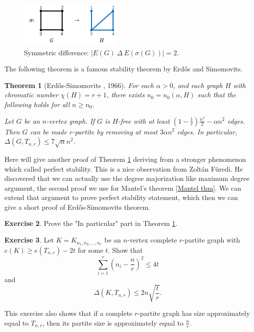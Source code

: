\documentclass{article}
\newtheorem{theorem}{Theorem}[section]
\theoremstyle{definition}
\newtheorem{exercise}[theorem]{Exercise}
\def\Erdos{Erd\H{o}s}
\begin{document}
\begin{figure}[htbp]
        \centering
        \includegraphics[width=5cm]{6-1.png}
        \caption{Symmetric difference: $|E(G)\ \Delta \ E(\sigma(G))| = 2$.}
        \label{fig:6-1}
    \end{figure}
The following theorem is a famous stability theorem by \Erdos{} and Simomovits.
\begin{theorem}[\Erdos{}-Simomovits \cite{Erds1966}, 1966]{}{}\label{ESstability}
    For each $\alpha >0$, and each graph $H$ with chromatic number $\chi(H) = r+1$, there exists $n_0 = n_0(\alpha , H)$ such that the following holds for all $n \geq n_0$.
    
    Let $G$ be an $n$-vertex graph. If $G$ is $H$-free with at least $(1-\frac{1}{r})\frac{n^2}{2}-\alpha n^2$ edges. Then $G$ can be made $r$-partite by removing at most $3\alpha n^2$ edges.
    In particular, $\Delta(G,T_{n,r}) \leq 7\sqrt{\alpha}n^2$.
\end{theorem}

Here will give another proof of Theorem \ref{ESstability} deriving from a stronger phenomenon which called perfect stability. This is a nice observation from Zolt\'an F\"uredi. He discovered that we can actually use the degree  majorization like maximum degree argument, the second proof we use for Mantel's theorem \ref{Mantel thm}. We can extend that argument to prove perfect stability statement, which then we can give a short proof of \Erdos{}-Simomovits theorem.

\begin{exercise}
    Prove the "In particular" part in Theorem \ref{ESstability}.
\end{exercise}

\begin{exercise}
    Let $K=K_{n_1, n_2, \dots, n_r}$ be an $n$-vertex complete $r$-partite graph with $e(K) \geq e(T_{n,r}) -2t$ for some $t$. Show that $$\sum\limits_{i=1}^{r} (n_i - \frac{n}{r})^2 \leq 4t$$ and $$\Delta(K,T_{n,r}) \leq 2n\sqrt{\frac{t}{r}}.$$
\end{exercise}
This exercise also shows that if a complete $r$-partite graph has size approximately equal to $T_{n,r}$, then its partite size is approximately equal to $\frac{n}{r}$.
\end{document}
